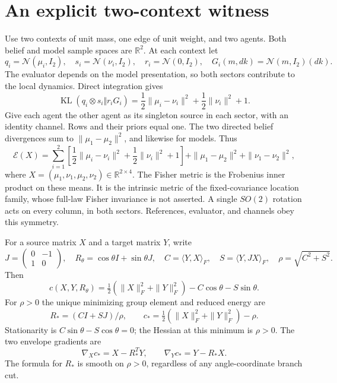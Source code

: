 \documentclass[11pt]{article}
\DeclareMathOperator{\KL}{KL}
\newcommand{\R}{\mathbb R}
\begin{document}
\section{An explicit two-context witness}

Use two contexts of unit mass, one edge of unit weight, and two agents. Both belief and model sample spaces are $\R^2$. At each context let
\begin{equation}
 q_i=\mathcal N(\mu_i,I_2),\quad s_i=\mathcal N(\nu_i,I_2),\quad
 r_i=\mathcal N(0,I_2),\quad G_i(m,dk)=\mathcal N(m,I_2)(dk).
\end{equation}
The evaluator depends on the model presentation, so both sectors contribute to the local dynamics. Direct integration gives
\begin{equation}
 \KL(q_i\otimes s_i\Vert r_iG_i)
 =\frac12\|\mu_i-\nu_i\|^2+\frac12\|\nu_i\|^2+1.
\end{equation}
Give each agent the other agent as its singleton source in each sector, with an identity channel. Rows and their priors equal one. The two directed belief divergences sum to $\|\mu_1-\mu_2\|^2$, and likewise for models. Thus
\begin{equation}
 \mathcal E(X)=\sum_{i=1}^2\left[
 \frac12\|\mu_i-\nu_i\|^2+\frac12\|\nu_i\|^2+1\right]
 +\|\mu_1-\mu_2\|^2+\|\nu_1-\nu_2\|^2,
 \label{eq:examplelocal}
\end{equation}
where $X=(\mu_1,\nu_1,\mu_2,\nu_2)\in\R^{2\times4}$. The Fisher metric is the Frobenius inner product on these means. It is the intrinsic metric of the fixed-covariance location family, whose full-law Fisher invariance is not asserted. A single $SO(2)$ rotation acts on every column, in both sectors. References, evaluator, and channels obey this symmetry.

For a source matrix $X$ and a target matrix $Y$, write
\begin{equation}
 J=\begin{pmatrix}0&-1\\1&0\end{pmatrix},\quad
 R_\theta=\cos\theta I+\sin\theta J,\quad
 C=\langle Y,X\rangle_F,\quad S=\langle Y,JX\rangle_F,\quad
 \rho=\sqrt{C^2+S^2}.
\end{equation}
Then
\begin{equation}
 c(X,Y,R_\theta)=\tfrac12(\|X\|_F^2+\|Y\|_F^2)-C\cos\theta-S\sin\theta.
\end{equation}
For $\rho>0$ the unique minimizing group element and reduced energy are
\begin{equation}
 R_*=(CI+SJ)/\rho,\qquad
 c_* =\tfrac12(\|X\|_F^2+\|Y\|_F^2)-\rho.
 \label{eq:procrustes}
\end{equation}
Stationarity is $C\sin\theta-S\cos\theta=0$; the Hessian at this minimum is $\rho>0$. The two envelope gradients are
\begin{equation}
 \nabla_Xc_*=X-R_*^TY,\qquad \nabla_Yc_*=Y-R_*X.
\end{equation}
The formula for $R_*$ is smooth on $\rho>0$, regardless of any angle-coordinate branch cut.
\end{document}
